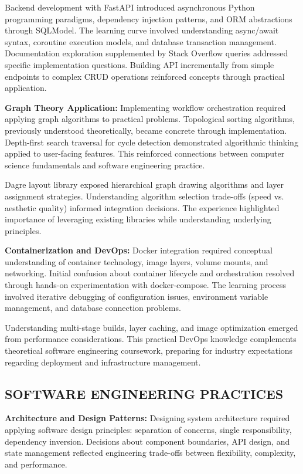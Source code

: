 \documentclass[12pt]{article}
\begin{document}
Backend development with FastAPI introduced asynchronous Python programming paradigms, dependency injection patterns, and ORM abstractions through SQLModel. The learning curve involved understanding async/await syntax, coroutine execution models, and database transaction management. Documentation exploration supplemented by Stack Overflow queries addressed specific implementation questions. Building API incrementally from simple endpoints to complex CRUD operations reinforced concepts through practical application.

\hspace{\parindent}\textbf{Graph Theory Application:} Implementing workflow orchestration required applying graph algorithms to practical problems. Topological sorting algorithms, previously understood theoretically, became concrete through implementation. Depth-first search traversal for cycle detection demonstrated algorithmic thinking applied to user-facing features. This reinforced connections between computer science fundamentals and software engineering practice.

Dagre layout library exposed hierarchical graph drawing algorithms and layer assignment strategies. Understanding algorithm selection trade-offs (speed vs. aesthetic quality) informed integration decisions. The experience highlighted importance of leveraging existing libraries while understanding underlying principles.

\hspace{\parindent}\textbf{Containerization and DevOps:} Docker integration required conceptual understanding of container technology, image layers, volume mounts, and networking. Initial confusion about container lifecycle and orchestration resolved through hands-on experimentation with docker-compose. The learning process involved iterative debugging of configuration issues, environment variable management, and database connection problems.

Understanding multi-stage builds, layer caching, and image optimization emerged from performance considerations. This practical DevOps knowledge complements theoretical software engineering coursework, preparing for industry expectations regarding deployment and infrastructure management.

\subsection{SOFTWARE ENGINEERING PRACTICES}

\hspace{\parindent}\textbf{Architecture and Design Patterns:} Designing system architecture required applying software design principles: separation of concerns, single responsibility, dependency inversion. Decisions about component boundaries, API design, and state management reflected engineering trade-offs between flexibility, complexity, and performance.
\end{document}
